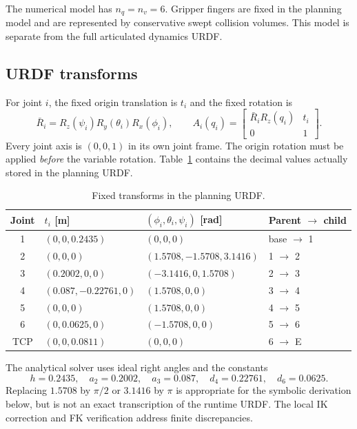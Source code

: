 \documentclass[11pt,a4paper]{report}
\begin{document}
The numerical model has $n_q=n_v=6$. Gripper fingers are fixed in the planning
model and are represented by conservative swept collision volumes. This
model is separate from the full articulated dynamics URDF.

\subsection{URDF transforms}
For joint $i$, the fixed origin translation is $t_i$ and the fixed rotation is
\begin{equation}
 \bar R_i=R_z(\psi_i)R_y(\theta_i)R_x(\phi_i),\qquad
 A_i(q_i)=\begin{bmatrix}\bar R_iR_z(q_i)&t_i\\0&1\end{bmatrix}.
 \label{eq:urdf}
\end{equation}
Every joint axis is $(0,0,1)$ in its own joint frame. The origin rotation
must be applied \emph{before} the variable rotation. Table~\ref{tab:origins}
contains the decimal values actually stored in the planning URDF.
\begin{table}[htbp]
\centering\small
\begin{tabular}{@{}clll@{}}
\toprule
Joint & $t_i$ [m] & $(\phi_i,\theta_i,\psi_i)$ [rad] & Parent $\to$ child \\
\midrule
1 & $(0,0,0.2435)$ & $(0,0,0)$ & base $\to$ 1\\
2 & $(0,0,0)$ & $(1.5708,-1.5708,3.1416)$ & 1 $\to$ 2\\
3 & $(0.2002,0,0)$ & $(-3.1416,0,1.5708)$ & 2 $\to$ 3\\
4 & $(0.087,-0.22761,0)$ & $(1.5708,0,0)$ & 3 $\to$ 4\\
5 & $(0,0,0)$ & $(1.5708,0,0)$ & 4 $\to$ 5\\
6 & $(0,0.0625,0)$ & $(-1.5708,0,0)$ & 5 $\to$ 6\\
TCP & $(0,0,0.0811)$ & $(0,0,0)$ & 6 $\to$ E\\
\bottomrule
\end{tabular}
\caption{Fixed transforms in the planning URDF.}\label{tab:origins}
\end{table}

The analytical solver uses ideal right angles and the constants
\begin{equation}
 h=0.2435,\quad a_2=0.2002,\quad a_3=0.087,\quad
 d_4=0.22761,\quad d_6=0.0625.
\end{equation}
Replacing $1.5708$ by $\pi/2$ or $3.1416$ by $\pi$ is appropriate for the
symbolic derivation below, but is not an exact transcription of the runtime
URDF. The local IK correction and FK verification address finite discrepancies.
\end{document}
